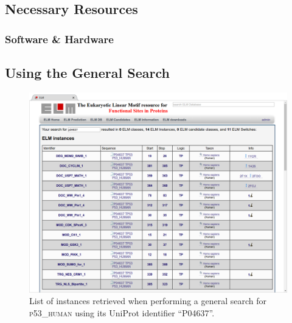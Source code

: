 \documentclass[12pt]{article}
\newcommand\uniprot[1]{%
	\textsc{\lowercase{#1}}%
}
\begin{document}
%
%
\subsection*{Necessary Resources}
\subsubsection*{Software \& Hardware}


%
%
\subsection*{Using the General Search}
\label{subsec:general_search_using}

\begin{enumerate}

\begin{figure}[h!]
	\centering
	\includegraphics[width=\textwidth]{Figures/general_search/P04637_instances.png}
	\caption{
		List of instances retrieved when performing a general search for
		\uniprot{P53\_HUMAN} using its UniProt identifier ``P04637''.
	}
	\label{fig:general_search_P04637_instances}
\end{figure}


\end{enumerate}
\end{document}

